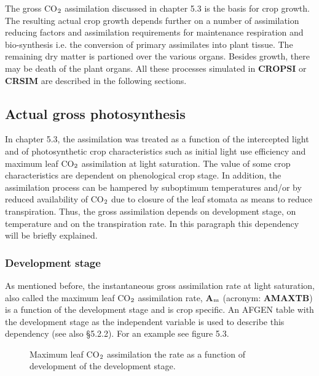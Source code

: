 The gross CO$_{{\rm 2}}$ assimilation discussed in chapter 5.3 is the basis for crop growth. The
resulting actual crop growth depends further on a number of assimilation reducing factors
and assimilation requirements for maintenance respiration and bio-synthesis i.e. the
conversion of primary assimilates into plant tissue. The remaining dry matter is partioned
over the various organs. Besides growth, there may be death of the plant organs. All
these processes simulated in {\bf CROPSI} or {\bf CRSIM} are described in the following sections.

\subsection{Actual gross photosynthesis}

In chapter 5.3, the assimilation was treated as a function of the intercepted light and of
photosynthetic crop characteristics such as initial light use efficiency and maximum leaf
CO$_{{\rm 2}}$ assimilation at light saturation. The value of some crop characteristics are dependent
on phenological crop stage. In addition, the assimilation process can be hampered by
suboptimum temperatures and/or by reduced availability of CO$_{{\rm 2}}$ due to closure of the leaf
stomata as means to reduce transpiration. Thus, the gross assimila\-tion depends on
development stage, on temperature and on the transpiration rate. In this para\-graph this
dependency will be briefly explained.

\subsubsection{Development stage}
As mentioned before, the instantaneous gross assimilation rate at light saturation, also
called the maximum leaf CO$_{{\rm 2}}$ assimilation rate, {\bf A$_{{\rm m}}$} (acronym: {\bf AMAXTB}) is a function of
the development stage and is crop specific. An AFGEN table with the development stage
as the independent variable is used to describe this dependency (see also \S 5.2.2). For an
example see figure 5.3.

\begin{figure}[htbp]
\caption{Maximum leaf CO$_{{\rm 2}}$ assimilation the rate as a function of develop\-ment of
the development stage.}
\begin{forcewidth}{8.44cm}
 \begin{center} \end{center}
\end{forcewidth}
\end{figure}


